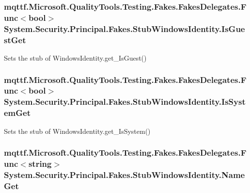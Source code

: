 \hypertarget{class_system_1_1_security_1_1_principal_1_1_fakes_1_1_stub_windows_identity_ad5e8633bbc1f867b31ffdbf2e64c8952}{
\subsubsection[{Is\-Guest\-Get}]{\setlength{\rightskip}{0pt plus 5cm}mqttf.\-Microsoft.\-Quality\-Tools.\-Testing.\-Fakes.\-Fakes\-Delegates.\-Func$<$bool$>$ System.\-Security.\-Principal.\-Fakes.\-Stub\-Windows\-Identity.\-Is\-Guest\-Get}}\label{class_system_1_1_security_1_1_principal_1_1_fakes_1_1_stub_windows_identity_ad5e8633bbc1f867b31ffdbf2e64c8952}


Sets the stub of Windows\-Identity.\-get\-\_\-\-Is\-Guest()

\hypertarget{class_system_1_1_security_1_1_principal_1_1_fakes_1_1_stub_windows_identity_a22326a63445ae5ac243856d2f4f8b366}{
\subsubsection[{Is\-System\-Get}]{\setlength{\rightskip}{0pt plus 5cm}mqttf.\-Microsoft.\-Quality\-Tools.\-Testing.\-Fakes.\-Fakes\-Delegates.\-Func$<$bool$>$ System.\-Security.\-Principal.\-Fakes.\-Stub\-Windows\-Identity.\-Is\-System\-Get}}\label{class_system_1_1_security_1_1_principal_1_1_fakes_1_1_stub_windows_identity_a22326a63445ae5ac243856d2f4f8b366}


Sets the stub of Windows\-Identity.\-get\-\_\-\-Is\-System()

\hypertarget{class_system_1_1_security_1_1_principal_1_1_fakes_1_1_stub_windows_identity_a4135db4b71a8293f8742e4933457a470}{
\subsubsection[{Name\-Get}]{\setlength{\rightskip}{0pt plus 5cm}mqttf.\-Microsoft.\-Quality\-Tools.\-Testing.\-Fakes.\-Fakes\-Delegates.\-Func$<$string$>$ System.\-Security.\-Principal.\-Fakes.\-Stub\-Windows\-Identity.\-Name\-Get}}\label{class_system_1_1_security_1_1_principal_1_1_fakes_1_1_stub_windows_identity_a4135db4b71a8293f8742e4933457a470}


